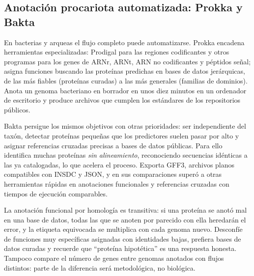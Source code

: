 \subsection{Anotación procariota automatizada: Prokka y Bakta}

En bacterias y arqueas el flujo completo puede automatizarse. Prokka \parencite{c08-seemann2014} encadena herramientas especializadas: Prodigal para las regiones codificantes y otros programas para los genes de ARNr, ARNt, ARN no codificantes y péptidos señal; asigna funciones buscando las proteínas predichas en bases de datos jerárquicas, de las más fiables (proteínas curadas) a las más generales (familias de dominios). Anota un genoma bacteriano en borrador en unos diez minutos en un ordenador de escritorio y produce archivos que cumplen los estándares de los repositorios públicos.

Bakta \parencite{c08-schwengers2021} persigue los mismos objetivos con otras prioridades: ser independiente del taxón, detectar proteínas pequeñas que los predictores suelen pasar por alto y asignar referencias cruzadas precisas a bases de datos públicas. Para ello identifica muchas proteínas \emph{sin alineamiento}, reconociendo secuencias idénticas a las ya catalogadas, lo que acelera el proceso. Exporta GFF3, archivos planos compatibles con INSDC y JSON, y en sus comparaciones superó a otras herramientas rápidas en anotaciones funcionales y referencias cruzadas con tiempos de ejecución comparables.


\begin{cuidado}
La anotación funcional por homología es transitiva: si una proteína se anotó mal en una base de datos, todas las que se anoten por parecido con ella heredarán el error, y la etiqueta equivocada se multiplica con cada genoma nuevo. Desconfíe de funciones muy específicas asignadas con identidades bajas, prefiera bases de datos curadas y recuerde que ``proteína hipotética'' es una respuesta honesta. Tampoco compare el número de genes entre genomas anotados con flujos distintos: parte de la diferencia será metodológica, no biológica.
\end{cuidado}

